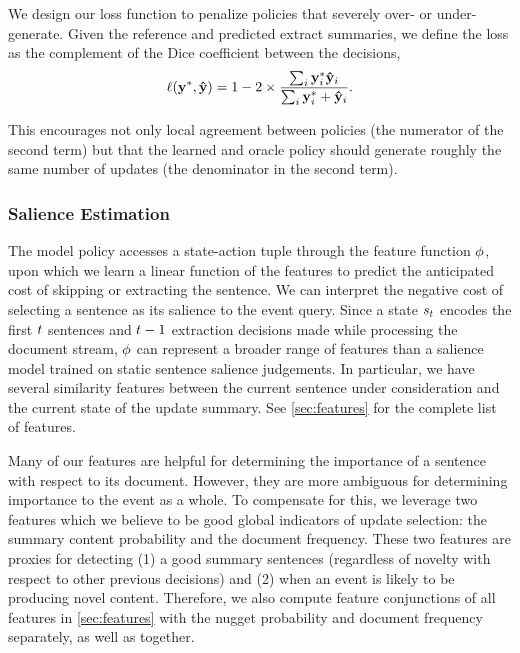 We design our loss function to penalize policies that severely over- or
 under-generate. 
 Given the reference and predicted extract summaries, 
 we define the loss as the complement of
 the Dice coefficient between the decisions,
\begin{align*}
  \ell(\mathbf{y}^*, \mathbf{\hat{y}}) = 1 - 2 \times 
    \frac{ \sum_i \mathbf{y}^*_i \mathbf{\hat{y}}_i }{ 
    \sum_i \mathbf{y}^*_i + \mathbf{\hat{y}}_i }.
\end{align*}

 This encourages not only local agreement between policies (the numerator of
 the second term) but that the learned and oracle policy should generate
 roughly the same number of updates (the denominator in the second term).

\subsubsection{Salience Estimation}
The model policy accesses a state-action tuple through the feature function 
$\phi$, upon which we learn a linear function of the features to predict 
the anticipated cost of skipping or extracting the sentence. We can interpret
the negative cost of selecting a sentence as its salience to the event
query. Since a
state $s_t$ encodes the first $t$ sentences and $t-1$
extraction decisions made while processing the document stream, $\phi$
can represent a broader range of features than a salience model trained 
on static sentence salience judgements. In particular, we have several
similarity features between the current sentence under consideration and
the current state of the update summary. See \autoref{sec:features} for the 
complete list of features. 

Many of our features are helpful for
 determining the importance of a sentence with respect to its document.
 However, they are more ambiguous for determining importance to the event as
 a whole. %
 To compensate for this, we
 leverage two features which we believe to be good global indicators of
 update selection: the summary content probability and the document
 frequency.  These two features are proxies for detecting (1) a good summary
 sentences (regardless of novelty with respect to other previous decisions)
 and (2) when an event is likely to be producing novel content. 
 Therefore, we also 
 compute
  feature conjunctions of all features in \autoref{sec:features} with the nugget 
 probability and document 
 frequency separately, as well as together.

